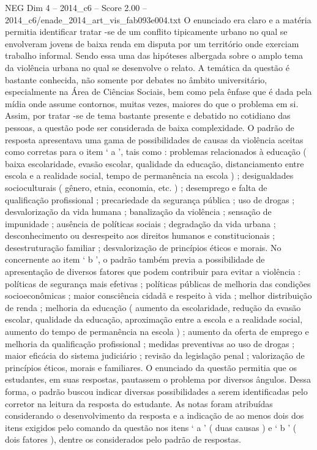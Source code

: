 \begin{textsample}{NEG Dim 4 – 2014\_c6 – Score 2.00 – 2014\_c6/enade\_2014\_art\_vis\_fab093e004.txt}
O enunciado era claro e a matéria permitia identificar tratar -se de um conflito tipicamente urbano no qual se envolveram jovens de baixa renda em disputa por um território onde exerciam trabalho informal.
Sendo essa uma das hipóteses albergada sobre o amplo tema da violência urbana no qual se desenvolve o relato.
A temática da questão é bastante conhecida, não somente por debates no âmbito universitário, especialmente na Área de Ciências Sociais, bem como pela ênfase que é dada pela mídia onde assume contornos, muitas vezes, maiores do que o problema em si.
Assim, por tratar -se de tema bastante presente e debatido no cotidiano das pessoas, a questão pode ser considerada de baixa complexidade.
O padrão de resposta apresentava uma gama de possibilidades de causas da violência aceitas como corretas para o item ‘ a ’, tais como : problemas relacionados à educação ( baixa escolaridade, evasão escolar, qualidade da educação, distanciamento entre escola e a realidade social, tempo de permanência na escola ) ; desigualdades socioculturais ( gênero, etnia, economia, etc. ) ; desemprego e falta de qualificação profissional ; precariedade da segurança pública ; uso de drogas ; desvalorização da vida humana ; banalização da violência ; sensação de impunidade ; ausência de políticas sociais ; degradação da vida urbana ; desconhecimento ou desrespeito aos direitos humanos e constitucionais ; desestruturação familiar ; desvalorização de princípios éticos e morais.
No concernente ao item ‘ b ’, o padrão também previa a possibilidade de apresentação de diversos fatores que podem contribuir para evitar a violência : políticas de segurança mais efetivas ; políticas públicas de melhoria das condições socioeconômicas ; maior consciência cidadã e respeito à vida ; melhor distribuição de renda ; melhoria da educação ( aumento da escolaridade, redução da evasão escolar, qualidade da educação, aproximação entre a escola e a realidade social, aumento do tempo de permanência na escola ) ; aumento da oferta de emprego e melhoria da qualificação profissional ; medidas preventivas ao uso de drogas ; maior eficácia do sistema judiciário ; revisão da legislação penal ; valorização de princípios éticos, morais e familiares.
O enunciado da questão permitia que os estudantes, em suas respostas, pautassem o problema por diversos ângulos.
Dessa forma, o padrão buscou indicar diversas possibilidades a serem identificadas pelo corretor na leitura da resposta do estudante.
As notas foram atribuídas considerando o desenvolvimento da resposta e a indicação de ao menos dois dos itens exigidos pelo comando da questão nos itens ‘ a ’ ( duas causas ) e ‘ b ’ ( dois fatores ), dentre os considerados pelo padrão de respostas.

\end{textsample}
